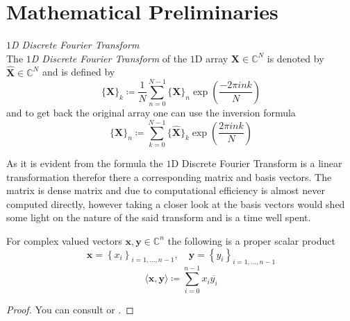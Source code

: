 \chapter{Mathematical Preliminaries}






\begin{Def}\label{def:1ddft}
    \emph{$1$D Discrete Fourier Transform}\\
    The \emph{$1$D Discrete Fourier Transform} of the $1$D array $\boldsymbol{X} \in \mathbb{C}^{N}$ is denoted by 
    $\hat {\boldsymbol{X}} \in \mathbb{C}^{N}$ and is defined by
    \begin{equation}\label{eq:1ddft}
        \{\hat {\boldsymbol{X}}\}_{k} \coloneqq \frac{1}{N}\sum_{n=0}^{N-1} \{{\boldsymbol{X}}\}_{n}\exp\left({\frac{-2\pi ink}{N}}\right)
    \end{equation}
    and to get back the original array one can use the inversion formula
    \begin{equation}\label{eq:1didft}
        \{{\boldsymbol{X}}\}_{n} \coloneqq \sum_{k=0}^{N-1}\{\hat {\boldsymbol{X}}\}_{k}\exp\left({\frac{2\pi ink}{N}}\right)
    \end{equation}    
\end{Def}

As it is evident from the formula the $1$D Discrete Fourier Transform is a linear transformation therefor 
there a corresponding matrix and basis vectors. The matrix is dense matrix and due to computational efficiency 
is almost never computed directly, however taking a closer look at the basis vectors would shed some light on 
the nature of the said transform and is a time well spent.

\begin{Prop}
    For complex valued vectors $\boldsymbol{x},\boldsymbol{y} \in \mathbb{C}^n$ the following is a proper scalar product
    \begin{equation*}
        \boldsymbol{x} = \left\{x_i\right\}_{i=1,\ldots,n-1}, \quad \boldsymbol{y} = \left\{y_i\right\}_{i=1,\ldots,n-1}
    \end{equation*}
    \begin{equation*}
        \langle\boldsymbol{x},\boldsymbol{y}\rangle \coloneqq \sum_{i=0}^{n-1} x_i \overline{y_i} 
    \end{equation*}
\end{Prop}

\begin{proof}
    You can consult \cite{Frazier1999} or \cite{Horn2012} \cite{Hackbusch2019}.
\end{proof}






